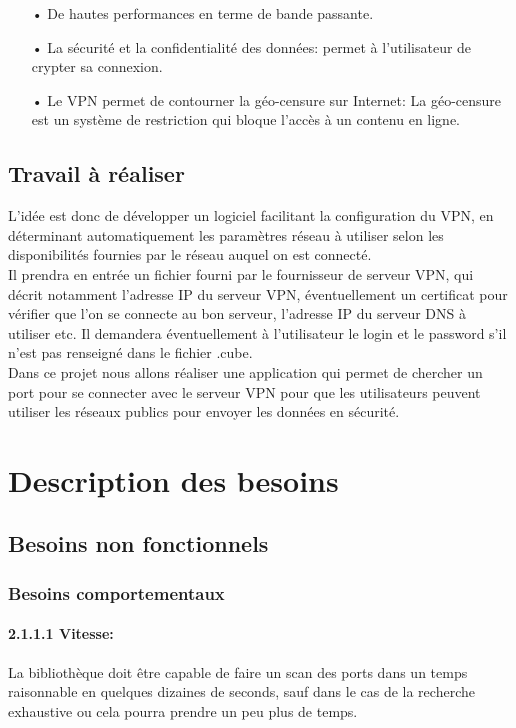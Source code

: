 \documentclass[12pt,a4paper]{article}
\begin{document}
\begin{itemize}
\item[•] De hautes performances en terme de bande passante.\\
\item[•] La sécurité et la confidentialité des données: permet à l’utilisateur de crypter sa connexion.\\
\item[•] Le VPN permet de contourner la géo-censure sur Internet: La géo-censure est un système de restriction qui bloque l’accès à un contenu en ligne.
\end{itemize}
\subsection{Travail à réaliser}
L'idée est donc de développer un logiciel facilitant la configuration du VPN, en déterminant automatiquement les paramètres réseau à utiliser selon les disponibilités fournies par le réseau auquel on est connecté.\\
Il prendra en entrée un fichier fourni par le fournisseur de serveur VPN, qui décrit notamment l'adresse IP du serveur VPN, éventuellement un certificat pour vérifier que l'on se connecte au bon serveur, l'adresse IP du serveur DNS à utiliser etc. Il demandera éventuellement à l'utilisateur le login et le password s'il n'est pas renseigné dans le fichier .cube.\\

Dans ce projet nous allons réaliser une application qui permet de chercher un port pour se connecter avec le serveur VPN pour que les utilisateurs peuvent utiliser les réseaux publics pour envoyer les données en sécurité. 
\newpage

\section{Description des besoins}

\subsection{Besoins non fonctionnels}
\subsubsection{Besoins comportementaux}


\paragraph{2.1.1.1 Vitesse: }
La bibliothèque doit être capable de faire un scan des ports dans un temps raisonnable en quelques dizaines de seconds, sauf dans le cas de la recherche exhaustive ou cela pourra prendre un peu plus de temps.
\end{document}
